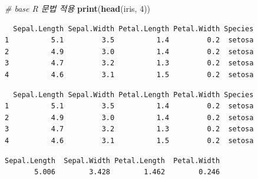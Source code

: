 \documentclass[
  11pt,
]{krantz}
\newenvironment{Shaded}{\begin{snugshade}}{\end{snugshade}}
\newcommand{\CommentTok}[1]{\textcolor[rgb]{0.37,0.37,0.37}{\textit{#1}}}
\newcommand{\DecValTok}[1]{\textcolor[rgb]{0.06,0.06,0.06}{#1}}
\newcommand{\KeywordTok}[1]{\textcolor[rgb]{0.27,0.27,0.27}{\textbf{#1}}}
\newcommand{\NormalTok}[1]{#1}
\newcommand{\OperatorTok}[1]{\textcolor[rgb]{0.43,0.43,0.43}{\textbf{#1}}}
\newcommand{\StringTok}[1]{\textcolor[rgb]{0.5,0.5,0.5}{#1}}
\begin{document}
\footnotesize

\begin{Shaded}
\begin{Highlighting}[]
\CommentTok{# base R 문법 적용}
\KeywordTok{print}\NormalTok{(}\KeywordTok{head}\NormalTok{(iris, }\DecValTok{4}\NormalTok{))}
\end{Highlighting}
\end{Shaded}

\begin{verbatim}
  Sepal.Length Sepal.Width Petal.Length Petal.Width Species
1          5.1         3.5          1.4         0.2  setosa
2          4.9         3.0          1.4         0.2  setosa
3          4.7         3.2          1.3         0.2  setosa
4          4.6         3.1          1.5         0.2  setosa
\end{verbatim}

\begin{Shaded}
\end{Shaded}

\begin{verbatim}
  Sepal.Length Sepal.Width Petal.Length Petal.Width Species
1          5.1         3.5          1.4         0.2  setosa
2          4.9         3.0          1.4         0.2  setosa
3          4.7         3.2          1.3         0.2  setosa
4          4.6         3.1          1.5         0.2  setosa
\end{verbatim}

\begin{Shaded}
\end{Shaded}

\begin{verbatim}
Sepal.Length  Sepal.Width Petal.Length  Petal.Width 
       5.006        3.428        1.462        0.246 
\end{verbatim}

\begin{Shaded}
\end{Shaded}
\end{document}
